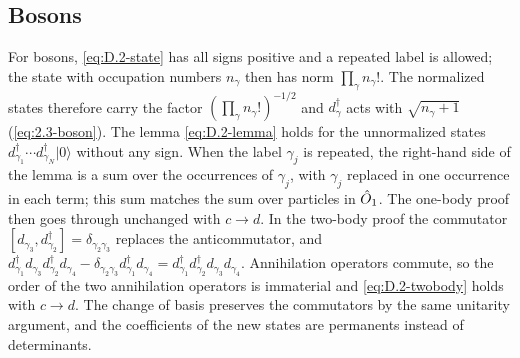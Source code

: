 \subsection*{Bosons}

For bosons, \cref{eq:D.2-state} has all signs positive and a repeated label is allowed; the state with occupation numbers $n_\gamma$ then has norm $\prod_\gamma n_\gamma!$. The normalized states therefore carry the factor $(\prod_\gamma n_\gamma!)^{-1/2}$ and $d^\dagger_\gamma$ acts with $\sqrt{n_\gamma + 1}$ (\cref{eq:2.3-boson}). The lemma \cref{eq:D.2-lemma} holds for the unnormalized states $d^\dagger_{\gamma_1}\cdots d^\dagger_{\gamma_N}|0\rangle$ without any sign. When the label $\gamma_j$ is repeated, the right-hand side of the lemma is a sum over the occurrences of $\gamma_j$, with $\gamma_j$ replaced in one occurrence in each term; this sum matches the sum over particles in $\hat{O}_1$. The one-body proof then goes through unchanged with $c \to d$. In the two-body proof the commutator $[d_{\gamma_3}, d^\dagger_{\gamma_2}] = \delta_{\gamma_2\gamma_3}$ replaces the anticommutator, and $d^\dagger_{\gamma_1}d_{\gamma_3}d^\dagger_{\gamma_2}d_{\gamma_4} - \delta_{\gamma_2\gamma_3}d^\dagger_{\gamma_1}d_{\gamma_4} = d^\dagger_{\gamma_1}d^\dagger_{\gamma_2}d_{\gamma_3}d_{\gamma_4}$. Annihilation operators commute, so the order of the two annihilation operators is immaterial and \cref{eq:D.2-twobody} holds with $c \to d$. The change of basis preserves the commutators by the same unitarity argument, and the coefficients of the new states are permanents instead of determinants.
